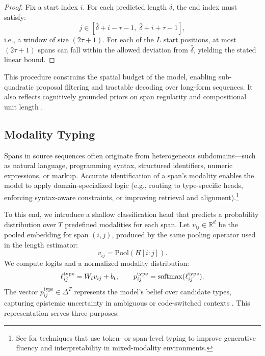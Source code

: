 \begin{proof}
Fix a start index \(i\). For each predicted length \(\hat\delta\), the end index must satisfy:
\[
j \in \left[\hat\delta + i - \tau - 1,\; \hat\delta + i + \tau - 1\right],
\]
i.e., a window of size \((2\tau + 1)\). For each of the \(L\) start positions, at most \((2\tau + 1)\) spans can fall within the allowed deviation from \(\hat\delta\), yielding the stated linear bound.
\end{proof}

This procedure constrains the spatial budget of the model, enabling sub-quadratic proposal filtering and tractable decoding over long-form sequences. It also reflects cognitively grounded priors on span regularity and compositional unit length \cite{jackendoff1977xbar, kreutzer2021distilling}.

\subsection{Modality Typing}

Spans in source sequences often originate from heterogeneous subdomains—such as natural language, programming syntax, structured identifiers, numeric expressions, or markup. Accurate identification of a span’s modality enables the model to apply domain-specialized logic (e.g., routing to type-specific heads, enforcing syntax-aware constraints, or improving retrieval and alignment).\footnote{See \cite{lin2021codemix, gupta2022molt} for techniques that use token- or span-level typing to improve generative fluency and interpretability in mixed-modality environments.}

To this end, we introduce a shallow classification head that predicts a probability distribution over \(T\) predefined modalities for each span. Let \(v_{ij} \in \mathbb{R}^d\) be the pooled embedding for span \((i,j)\), produced by the same pooling operator used in the length estimator:
\[
  v_{ij} = \mathrm{Pool}(H[i{:}j]).
\]
We compute logits and a normalized modality distribution:
\[
  \ell^\mathrm{type}_{ij} = W_t v_{ij} + b_t,
  \qquad
  p^\mathrm{type}_{ij} = \mathrm{softmax}(\ell^\mathrm{type}_{ij}).
\]
The vector \(p^\mathrm{type}_{ij} \in \Delta^T\) represents the model’s belief over candidate types, capturing epistemic uncertainty in ambiguous or code-switched contexts \cite{lin2021codemix}. This representation serves three purposes:

